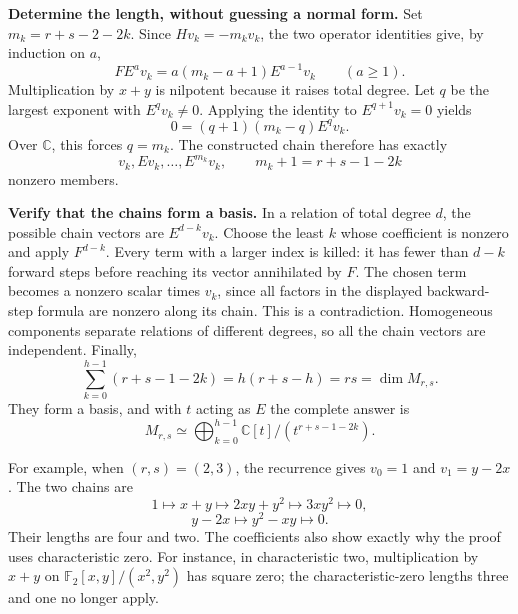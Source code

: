 \documentclass[11pt]{article}
\theoremstyle{remark}
\newcommand{\C}{\mathbb C}
\begin{document}
\textbf{Determine the length, without guessing a normal form.}
Set \(m_k=r+s-2-2k\). Since \(Hv_k=-m_kv_k\), the two operator identities give, by induction on \(a\),
\[
FE^av_k=a(m_k-a+1)E^{a-1}v_k\qquad(a\ge1).
\]
Multiplication by \(x+y\) is nilpotent because it raises total degree. Let \(q\) be the largest exponent with \(E^qv_k\ne0\). Applying the identity to \(E^{q+1}v_k=0\) yields
\[
0=(q+1)(m_k-q)E^qv_k.
\]
Over \(\C\), this forces \(q=m_k\). The constructed chain therefore has exactly
\[
v_k,Ev_k,\ldots,E^{m_k}v_k,
\qquad m_k+1=r+s-1-2k
\]
nonzero members.

\textbf{Verify that the chains form a basis.}
In a relation of total degree \(d\), the possible chain vectors are \(E^{d-k}v_k\). Choose the least \(k\) whose coefficient is nonzero and apply \(F^{d-k}\). Every term with a larger index is killed: it has fewer than \(d-k\) forward steps before reaching its vector annihilated by \(F\). The chosen term becomes a nonzero scalar times \(v_k\), since all factors in the displayed backward-step formula are nonzero along its chain. This is a contradiction. Homogeneous components separate relations of different degrees, so all the chain vectors are independent. Finally,
\[
\sum_{k=0}^{h-1}(r+s-1-2k)=h(r+s-h)=rs=\dim M_{r,s}.
\]
They form a basis, and with \(t\) acting as \(E\) the complete answer is
\[
M_{r,s}\simeq\bigoplus_{k=0}^{h-1}\C[t]/(t^{r+s-1-2k}).
\]

For example, when \((r,s)=(2,3)\), the recurrence gives \(v_0=1\) and \(v_1=y-2x\). The two chains are
\[
1\longmapsto x+y\longmapsto2xy+y^2\longmapsto3xy^2\longmapsto0,
\]
\[
y-2x\longmapsto y^2-xy\longmapsto0.
\]
Their lengths are four and two. The coefficients also show exactly why the proof uses characteristic zero. For instance, in characteristic two, multiplication by \(x+y\) on \(\mathbb F_2[x,y]/(x^2,y^2)\) has square zero; the characteristic-zero lengths three and one no longer apply.
\end{document}
